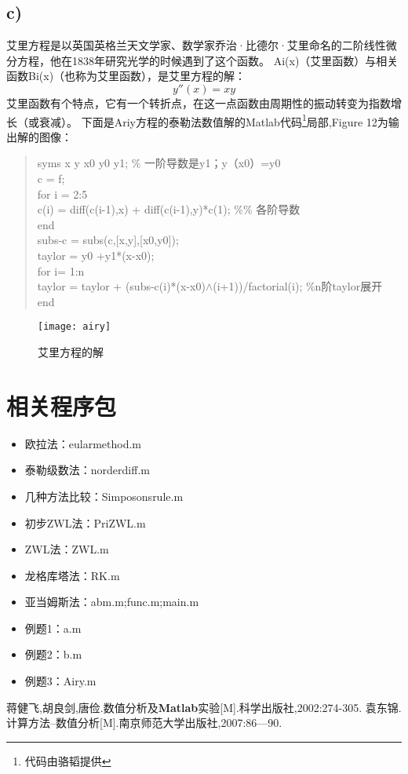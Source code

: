 \documentclass[a4paper,12pt]{article}
\begin{document}
\subsection{c)}
艾里方程是以英国英格兰天文学家、数学家乔治·比德尔·艾里命名的二阶线性微分方程，他在1838年研究光学的时候遇到了这个函数。
Ai(x)（艾里函数）与相关函数Bi(x)（也称为艾里函数），是艾里方程的解：
\begin{equation}\label{Airy Equation}
    y''(x)=xy
\end{equation}
艾里函数有个特点，它有一个转折点，在这一点函数由周期性的振动转变为指数增长（或衰减）。
下面是Ariy方程的泰勒法数值解的Matlab代码\footnote{代码由骆韬提供}局部,Figure 12为输出解的图像：
\begin{quote}
\small{
syms x y x0 y0 y1; \% 一阶导数是y1；y（x0）=y0\\
c = f;\\
for i = 2:5\\
c(i) = diff(c(i-1),x) + diff(c(i-1),y)*c(1); \%\% 各阶导数\\
end\\
subs-c = subs(c,[x,y],[x0,y0]);\\
taylor = y0 +y1*(x-x0);\\
for i= 1:n\\
   taylor = taylor + (subs-c(i)*(x-x0)$\wedge$(i+1))/factorial(i);  \%n阶taylor展开\\
end\\
}
\end{quote}

\begin{figure}
\centering
  \texttt{[image: airy]}\\
  \caption{艾里方程的解}
\end{figure}

\newpage

\section{相关程序包}
\begin{itemize}
  \item 欧拉法：eularmethod.m
  \item 泰勒级数法：norderdiff.m
  \item 几种方法比较：Simposonsrule.m
  \item 初步ZWL法：PriZWL.m
  \item ZWL法：ZWL.m
  \item 龙格库塔法：RK.m
  \item 亚当姆斯法：abm.m;func.m;main.m
  \item 例题1：a.m
  \item 例题2：b.m
  \item 例题3：Airy.m
\end{itemize}


\renewcommand\refname{参考文献}
\begin{thebibliography}{99}
 蒋健飞,胡良剑,唐俭.数值分析及\textbf{Matlab}实验[M].科学出版社,2002:274-305.            %
 袁东锦.计算方法--数值分析[M].南京师范大学出版社,2007:86—90.
\end{thebibliography}
\end{document}
